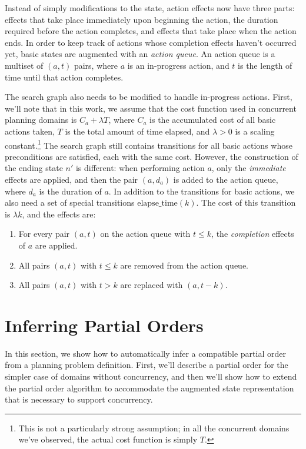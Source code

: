 \documentclass[letterpaper]{article}
\theoremstyle{plain} \newtheorem{theorem}{Theorem} \newtheorem{proposition}{Proposition} \newtheorem{lemma}{Lemma}
\theoremstyle{definition} \newtheorem{definition}{Definition} \newtheorem{conjecture}{Conjecture} \newtheorem*{example}{Example}
\theoremstyle{remark} \newtheorem*{remark}{Remark} \newtheorem*{note}{Note} \newtheorem{case}{Case}
\begin{document}
Instead of simply modifications to the state, action effects now have three parts: effects
that take place immediately upon beginning the action, the duration required before the
action completes, and effects that take place when the action ends. In order to keep track
of actions whose completion effects haven't occurred yet, basic states are augmented with
an \emph{action queue}. An action queue is a multiset of $(a, t)$ pairs, where $a$ is an
in-progress action, and $t$ is the length of time until that action completes.

The search graph also needs to be modified to handle in-progress actions. First, we'll note
that in this work, we assume that the cost function used in concurrent planning domains is
$C_a + \lambda T$, where $C_a$ is the accumulated cost of all basic actions taken, $T$ is
the total amount of time elapsed, and $\lambda > 0$ is a scaling constant.\footnote{This is
not a particularly strong assumption; in all the concurrent domains we've observed, the
actual cost function is simply $T$.} The search graph still contains transitions for all
basic actions whose preconditions are satisfied, each with the same cost. However, the
construction of the ending state $n'$ is different: when performing action $a$, only the
\emph{immediate} effects are applied, and then the pair $(a, d_a)$ is added to the action
queue, where $d_a$ is the duration of $a$. In addition to the transitions for basic actions, we also need a set of special transitions $\mathrm{elapse\_time}(k)$. The cost of this transition is $\lambda k$, and the effects are: 
\begin{enumerate}
	\item For every pair $(a, t)$ on the action queue with $t \le k$, the \emph{completion} effects of $a$ are applied.
	\item All pairs $(a, t)$ with $t \le k$ are removed from the action queue.
	\item All pairs $(a, t)$ with $t > k$ are replaced with $(a, t-k)$.
\end{enumerate}



\section{Inferring Partial Orders}

\newcommand{\po}{\preceq_R}

In this section, we show how to automatically infer a compatible partial order from a
planning problem definition. First, we'll describe a partial order for the simpler case of
domains without concurrency, and then we'll show how to extend the partial order algorithm
to accommodate the augmented state representation that is necessary to support concurrency.
\end{document}
